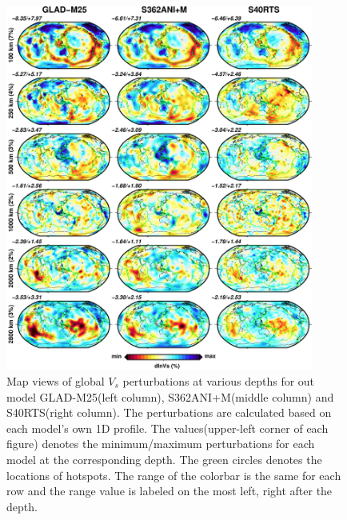 \documentclass[extra,mreferee]{gji}
\begin{document}
\begin{figure}
\includegraphics[width=0.9\textwidth]{figures/depth_slice/globe_vs.pdf}
  \caption{Map views of global $V_s$ perturbations at various depths for out model GLAD-M25(left column), S362ANI+M(middle column)\citep{moulik2014anisotropic} and S40RTS(right column)\citep{ritsema2011s40rts}. The perturbations are calculated based on each model's own 1D profile. The values(upper-left corner of each figure) denotes the minimum/maximum perturbations for each model at the corresponding depth. The green circles denotes the locations of hotspots\citep{montelli2006catalogue}. The range of the colorbar is the same for each row and the range value is labeled on the most left, right after the depth.}
\label{fig:global-vs}
\centering
\end{figure}

\end{document}
